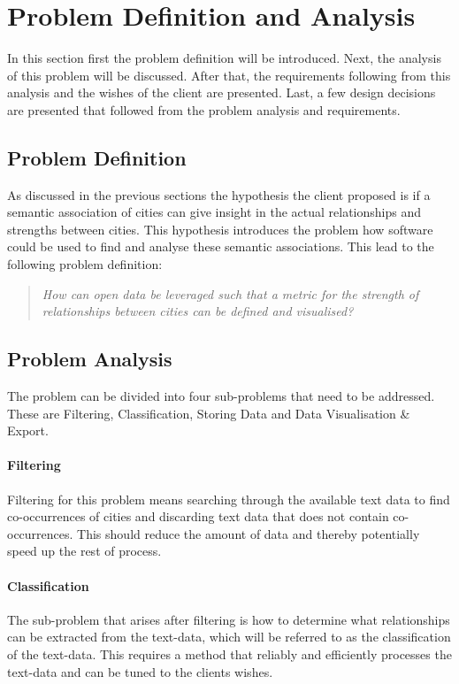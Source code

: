 \chapter{Problem Definition and Analysis}\label{sec:problem-definition-analysis}
In this section first the problem definition will be introduced. Next, the analysis of this problem will be discussed. After that, the requirements following from this analysis and the wishes of the client are presented. Last, a few design decisions are presented that followed from the problem analysis and requirements.

\section{Problem Definition}\label{sec:3-problem-definition}
As discussed in the previous sections the hypothesis the client proposed is if a semantic association of cities can give insight in the actual relationships and strengths between cities. This hypothesis introduces the problem how software could be used to find and analyse these semantic associations. This lead to the following problem definition:\\

\begin{quote} 
\centering 
\textit{How can open data be leveraged such that a metric for the strength of relationships between cities can be defined and visualised?}
\end{quote}

\section{Problem Analysis}\label{sec:3-problem-analysis}
The problem can be divided into four sub-problems that need to be addressed. These are Filtering, Classification, Storing Data and  Data Visualisation \& Export. 

\subsubsection{Filtering}
Filtering for this problem means searching through the available text data to find co-occurrences of cities and discarding text data that does not contain co-occurrences. This should reduce the amount of data and thereby potentially speed up the rest of process.

\subsubsection{Classification}
The sub-problem that arises after filtering is how to determine what relationships can be extracted from the text-data, which will be referred to as the classification of the text-data. This requires a method that reliably and efficiently processes the text-data and can be tuned to the clients wishes.


